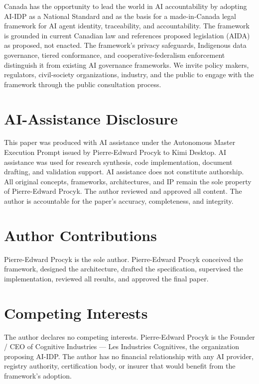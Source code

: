 \documentclass[11pt,a4paper]{article}
\begin{document}
Canada has the opportunity to lead the world in AI accountability by adopting AI-IDP as a National Standard and as the basis for a made-in-Canada legal framework for AI agent identity, traceability, and accountability. The framework is grounded in current Canadian law and references proposed legislation (AIDA) as proposed, not enacted. The framework's privacy safeguards, Indigenous data governance, tiered conformance, and cooperative-federalism enforcement distinguish it from existing AI governance frameworks. We invite policy makers, regulators, civil-society organizations, industry, and the public to engage with the framework through the public consultation process.

\section*{AI-Assistance Disclosure}

This paper was produced with AI assistance under the Autonomous Master Execution Prompt issued by Pierre-Edward Procyk to Kimi Desktop. AI assistance was used for research synthesis, code implementation, document drafting, and validation support. AI assistance does not constitute authorship. All original concepts, frameworks, architectures, and IP remain the sole property of Pierre-Edward Procyk. The author reviewed and approved all content. The author is accountable for the paper's accuracy, completeness, and integrity.

\section*{Author Contributions}

Pierre-Edward Procyk is the sole author. Pierre-Edward Procyk conceived the framework, designed the architecture, drafted the specification, supervised the implementation, reviewed all results, and approved the final paper.

\section*{Competing Interests}

The author declares no competing interests. Pierre-Edward Procyk is the Founder / CEO of Cognitive Industries --- Les Industries Cognitives, the organization proposing AI-IDP. The author has no financial relationship with any AI provider, registry authority, certification body, or insurer that would benefit from the framework's adoption.
\end{document}

